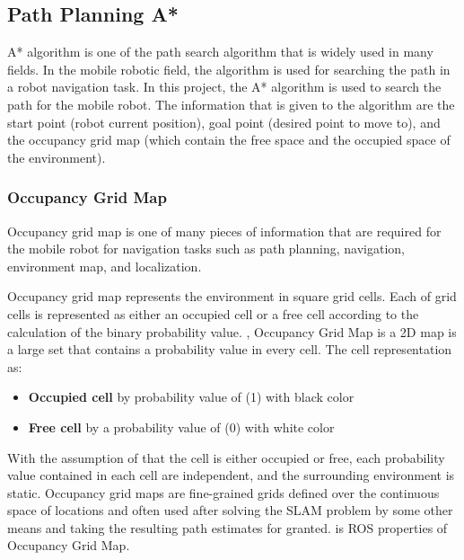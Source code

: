 \subsection{Path Planning A*}
\hspace{1.27cm}
A* algorithm is one of the path search algorithm that is widely used in many fields. In the mobile robotic field, the algorithm is used for searching the path in a robot navigation task. In this project, the A* algorithm is used to search the path for the mobile robot. The information that is given to the algorithm are the start point (robot current position), goal point (desired point to move to), and the occupancy grid map (which contain the free space and the occupied space of the environment).





















\subsubsection{Occupancy Grid Map}
\hspace{1.27cm}
Occupancy grid map is one of many pieces of information that are required for the mobile robot for navigation tasks such as path planning, navigation, environment map, and localization.\par
\hspace{1.27cm}
Occupancy grid map represents the environment in square grid cells. Each of grid cells is represented as either an occupied cell or a free cell according to the calculation of the binary probability value. \textbf{\figureautorefname{ \ref{fig:Occupancy Grid Map}}}, Occupancy Grid Map is a 2D map is a large set that contains a probability value in every cell. The cell representation as:
\begin{itemize}
	\item \textbf{Occupied cell} by probability value of (1) with black color
	\item \textbf{Free cell} by a probability value of (0) with white color
\end{itemize}
With the assumption of that the cell is either occupied or free, each probability value contained in each cell are independent, and the surrounding environment is static. Occupancy grid maps are fine-grained grids defined over the continuous space of locations and often used after solving the SLAM problem by some other means and taking the resulting path estimates for granted. \textbf{\tableautorefname{ \ref{Table: Occupancy Grid Map Properties}}} is ROS properties of Occupancy Grid Map.\par

